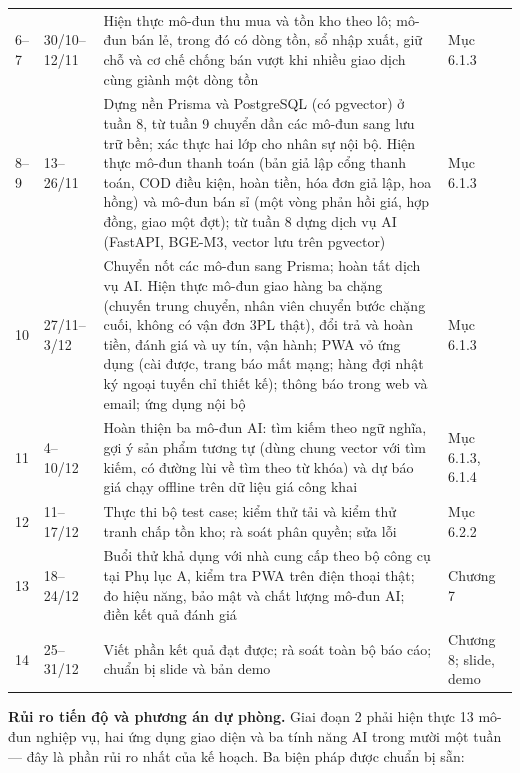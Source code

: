 \begin{longtable}{L{1.48cm} L{2.32cm} L{6.95cm} L{3.79cm}}
6--7 & 30/10--12/11 & Hiện thực mô-đun thu mua và tồn kho theo lô; mô-đun bán lẻ, trong đó có dòng tồn, sổ nhập xuất, giữ chỗ và cơ chế chống bán vượt khi nhiều giao dịch cùng giành một dòng tồn & Mục 6.1.3 \\
8--9 & 13--26/11 & Dựng nền Prisma và PostgreSQL (có pgvector) ở tuần 8, từ tuần 9 chuyển dần các mô-đun sang lưu trữ bền; xác thực hai lớp cho nhân sự nội bộ. Hiện thực mô-đun thanh toán (bản giả lập cổng thanh toán, COD điều kiện, hoàn tiền, hóa đơn giả lập, hoa hồng) và mô-đun bán sỉ (một vòng phản hồi giá, hợp đồng, giao một đợt); từ tuần 8 dựng dịch vụ AI (FastAPI, BGE-M3, vector lưu trên pgvector) & Mục 6.1.3 \\
10 & 27/11--3/12 & Chuyển nốt các mô-đun sang Prisma; hoàn tất dịch vụ AI. Hiện thực mô-đun giao hàng ba chặng (chuyến trung chuyển, nhân viên chuyển bước chặng cuối, không có vận đơn 3PL thật), đổi trả và hoàn tiền, đánh giá và uy tín, vận hành; PWA vỏ ứng dụng (cài được, trang báo mất mạng; hàng đợi nhật ký ngoại tuyến chỉ thiết kế); thông báo trong web và email; ứng dụng nội bộ & Mục 6.1.3 \\
11 & 4--10/12 & Hoàn thiện ba mô-đun AI: tìm kiếm theo ngữ nghĩa, gợi ý sản phẩm tương tự (dùng chung vector với tìm kiếm, có đường lùi về tìm theo từ khóa) và dự báo giá chạy offline trên dữ liệu giá công khai & Mục 6.1.3, 6.1.4 \\
12 & 11--17/12 & Thực thi bộ test case; kiểm thử tải và kiểm thử tranh chấp tồn kho; rà soát phân quyền; sửa lỗi & Mục 6.2.2 \\
13 & 18--24/12 & Buổi thử khả dụng với nhà cung cấp theo bộ công cụ tại Phụ lục A, kiểm tra PWA trên điện thoại thật; đo hiệu năng, bảo mật và chất lượng mô-đun AI; điền kết quả đánh giá & Chương 7 \\
14 & 25--31/12 & Viết phần kết quả đạt được; rà soát toàn bộ báo cáo; chuẩn bị slide và bản demo & Chương 8; slide, demo \\
\end{longtable}
\endgroup

\noindent\textbf{Rủi ro tiến độ và phương án dự phòng.} Giai đoạn 2 phải hiện thực 13 mô-đun nghiệp vụ, hai ứng dụng giao diện và ba tính năng AI trong mười một tuần --- đây là phần rủi ro nhất của kế hoạch. Ba biện pháp được chuẩn bị sẵn:


